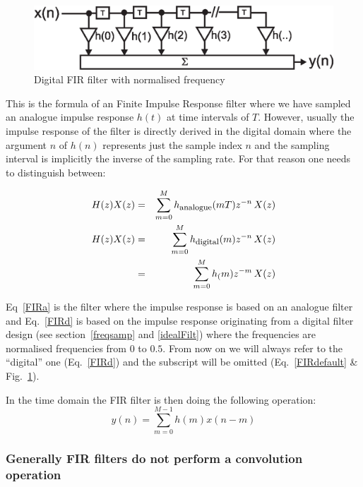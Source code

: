 \documentclass[12pt,a4paper]{article}
\begin{document}
\begin{figure}[!hbt]
\begin{center}
\mbox{\includegraphics[width=\linewidth]{fir_digital}}
\caption{Digital FIR filter with normalised frequency \label{fir_digital}}
\end{center}
\end{figure}

This is the formula of an Finite Impulse Response filter where we have
sampled an analogue impulse response $h(t)$ at time intervals of $T$.
However, usually the impulse response of the filter is directly derived
in the digital domain where the argument $n$ of $h(n)$ represents just the sample
index $n$ and the sampling interval is implicitly the inverse of the sampling
rate. For that reason one needs to distinguish between:

\begin{eqnarray}
H(z)X(z) & = & \sum_{m=0}^M h_\textrm{\footnotesize{analogue}}(mT) z^{-n} \, X(z) \label{FIRa} \\
H(z)X(z) & = & \sum_{m=0}^M h_\textrm{\footnotesize{digital}}(m) z^{-n} \, X(z) \label{FIRd} \\
         & = & \sum_{m=0}^M h_(m) z^{-m} \, X(z) \label{FIRdefault}
\end{eqnarray}

Eq~\ref{FIRa} is the filter where the impulse response is based on an analogue
filter and Eq.~\ref{FIRd} is based on the impulse response originating from a digital filter
design (see section~\ref{freqsamp} and \ref{idealFilt}) where the frequencies
are normalised frequencies from $0$ to $0.5$. From now on we will
always refer to the ``digital'' one (Eq.~\ref{FIRd}) and the subscript will be
omitted (Eq.~\ref{FIRdefault} \& Fig.~\ref{fir_digital}).

In the time domain the FIR filter is then doing the following operation:
\begin{equation}
  y(n) = \sum_{m=0}^{M-1} h(m) x(n-m) \label{FIRtime}
\end{equation}

\subsubsection{Generally FIR filters do not perform a convolution operation}
\end{document}

